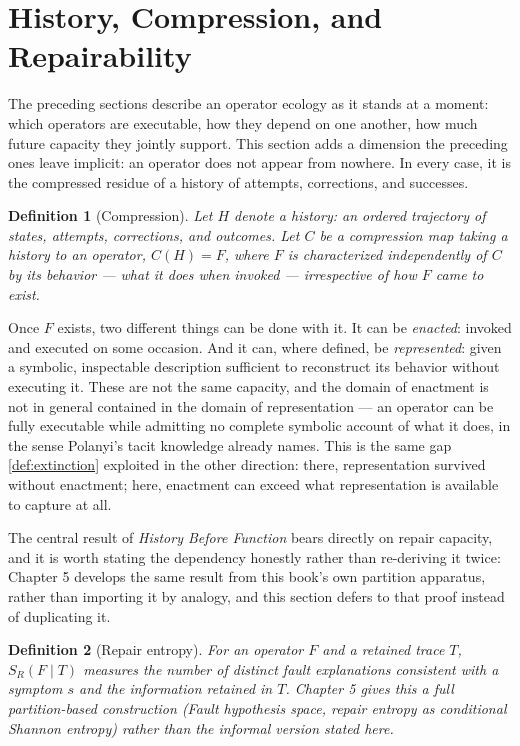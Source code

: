 \documentclass[12pt]{report}
\newtheorem{definition}{Definition}[section]
\newcommand{\SR}{\ensuremath{S_R}}
\begin{document}
\section{History, Compression, and Repairability}
\label{sec:history}

The preceding sections describe an operator ecology as it stands at a
moment: which operators are executable, how they depend on one another,
how much future capacity they jointly support. This section adds a
dimension the preceding ones leave implicit: an operator does not appear
from nowhere. In every case, it is the compressed residue of a history of
attempts, corrections, and successes.

\begin{definition}[Compression]
\label{def:compression}
Let $H$ denote a history: an ordered trajectory of states, attempts,
corrections, and outcomes. Let $C$ be a compression map taking a history
to an operator, $C(H) = F$, where $F$ is characterized independently of
$C$ by its behavior --- what it does when invoked --- irrespective of how
$F$ came to exist.
\end{definition}

Once $F$ exists, two different things can be done with it. It can be
\emph{enacted}: invoked and executed on some occasion. And it can, where
defined, be \emph{represented}: given a symbolic, inspectable description
sufficient to reconstruct its behavior without executing it. These are
not the same capacity, and the domain of enactment is not in general
contained in the domain of representation --- an operator can be fully
executable while admitting no complete symbolic account of what it does,
in the sense Polanyi's tacit knowledge already names. This is the same
gap \cref{def:extinction} exploited in the other direction: there,
representation survived without enactment; here, enactment can exceed
what representation is available to capture at all.

The central result of \emph{History Before Function} bears directly on
repair capacity, and it is worth stating the dependency honestly rather
than re-deriving it twice: Chapter 5 develops the same result from this
book's own partition apparatus, rather than importing it by analogy, and
this section defers to that proof instead of duplicating it.

\begin{definition}[Repair entropy]
\label{def:repair-entropy}
For an operator $F$ and a retained trace $T$, $\SR(F \mid T)$ measures
the number of distinct fault explanations consistent with a symptom $s$
and the information retained in $T$. Chapter 5 gives this a full
partition-based construction (Fault hypothesis space, repair entropy as
conditional Shannon entropy) rather than the informal version stated
here.
\end{definition}
\end{document}
